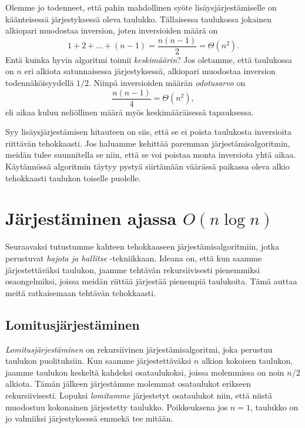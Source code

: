 Olemme jo todenneet, että pahin mahdollinen syöte
lisäysjärjestämiselle on käänteisessä järjestyksessä oleva taulukko.
Tällaisessa taulukossa jokainen alkiopari muodostaa inversion,
joten inversioiden määrä on
\[1+2+\dots+(n-1)=\frac{n(n-1)}{2}=\Theta(n^2).\]
Entä kuinka hyvin algoritmi toimii \emph{keskimäärin}?
Jos oletamme, että taulukossa on $n$ eri alkiota satunnaisessa
järjestyksessä, alkiopari muodostaa inversion todennäköisyydellä $1/2$.
Niinpä inversioiden määrän \emph{odotusarvo} on
\[\frac{n(n-1)}{4}=\Theta(n^2),\]
eli aikaa kuluu neliöllinen määrä myös keskimääräisessä
tapauksessa.

Syy lisäysjärjestämisen hitauteen on siis,
että se ei poista taulukosta inversioita riittävän tehokkaasti.
Jos haluamme kehittää paremman järjestämis\-algoritmin,
meidän tulee suunnitella se niin, että se voi poistaa
monta inversiota yhtä aikaa.
Käytännössä algoritmin täytyy pystyä siirtämään
väärässä paikassa oleva alkio tehokkaasti taulukon
toiselle puolelle.

\section{Järjestäminen ajassa $O(n \log n)$}

Seuraavaksi tutustumme kahteen tehokkaaseen
järjestämisalgoritmiin, jotka perustuvat
\emph{hajota ja hallitse} -tekniikkaan.
Ideana on, että kun saamme järjestettäväksi taulukon,
jaamme tehtävän rekursiivisesti pienemmiksi osa\-ongelmiksi,
joissa meidän riittää järjestää pienempiä taulukoita.
Tämä auttaa meitä ratkaisemaan tehtävän tehokkaasti.

\subsection{Lomitusjärjestäminen}

\emph{Lomitusjärjestäminen} on rekursiivinen järjestämisalgoritmi,
joka perustuu taulukon puolituksiin.
Kun saamme järjestettäväksi $n$ alkion kokoisen taulukon,
jaamme taulukon keskeltä kahdeksi osataulukoksi,
joissa molemmissa on noin $n/2$ alkiota.
Tämän jälkeen järjestämme molemmat osataulukot erikseen rekursiivisesti.
Lopuksi \emph{lomitamme} järjestetyt osataulukot niin,
että niistä muodostuu kokonainen järjestetty taulukko.
Poikkeuksena jos $n=1$, taulukko on jo valmiiksi
järjestyksessä emmekä tee mitään.


